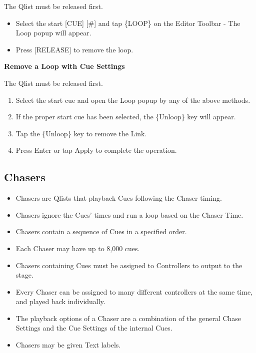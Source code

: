 \documentclass[
]{article}
\begin{document}
The Qlist must be released first.

\begin{itemize}
\item
  Select the start {[}CUE{]} {[}\#{]} and tap \{LOOP\} on the Editor Toolbar - The Loop popup will appear.
\item
  Press {[}RELEASE{]} to remove the loop.
\end{itemize}

\textbf{Remove a Loop with Cue Settings}

The Qlist must be released first.

\begin{enumerate}
\def\labelenumi{\arabic{enumi}.}
\item
  Select the start cue and open the Loop popup by any of the above methods.
\item
  If the proper start cue has been selected, the \{Unloop\} key will appear.
\item
  Tap the \{Unloop\} key to remove the Link.
\item
  Press Enter or tap Apply to complete the operation.
\end{enumerate}

\hypertarget{Chasers-10.6}{%
\subsection{Chasers}\label{Chasers-10.6}}

\begin{itemize}
\item
  Chasers are Qlists that playback Cues following the Chaser timing.
\item
  Chasers ignore the Cues' times and run a loop based on the Chaser Time.
\item
  Chasers contain a sequence of Cues in a specified order.
\item
  Each Chaser may have up to 8,000 cues.
\item
  Chasers containing Cues must be assigned to Controllers to output to the stage.
\item
  Every Chaser can be assigned to many different controllers at the same time, and played back individually.
\item
  The playback options of a Chaser are a combination of the general Chase Settings and the Cue Settings of the internal Cues.
\item
  Chasers may be given Text labels.
\end{itemize}
\end{document}
